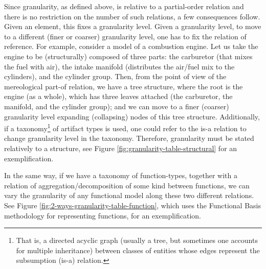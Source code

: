 \documentclass[
]{ceurart}
\begin{document}
\eflist
Since granularity, as defined above, is relative to a partial-order relation and there is no restriction on the number of such relations, a few consequences follow. Given an element, this fixes a granularity level. Given a granularity level, to move to a different (finer or coarser) granularity level, one has to fix the relation of reference. For example, consider a model of a combustion engine. Let us take the engine to be (structurally) composed of three parts: the carburetor (that mixes the fuel with air), the intake manifold (distributes the air/fuel mix to the cylinders), and the cylinder group. Then, from the point of view of the mereological part-of relation, we have a tree structure, where the root is the engine (as a whole), which has three leaves attached (the carburetor, the manifold, and the cylinder group); and we can move to a finer (coarser) granularity level expanding (collapsing) nodes of this tree structure. Additionally, if a taxonomy\footnote{That is, a directed acyclic graph (usually a tree, but sometimes one accounts for multiple inheritance) between classes of entities whose edges represent the subsumption (is-a) relation.} of artifact types is used, one could refer to the is-a relation to change granularity level in the taxonomy. Therefore, granularity must be stated relatively to a structure, see Figure \ref{fig:granularity-table-structural} for an exemplification. 

In the same way, if we have a taxonomy of function-types, together with a relation of aggregation/decomposition of some kind between functions, we can vary the granularity of any functional model along these two different relations. See Figure \ref{fig:2-ways-granularity-table-function}, which uses the Functional Basis methodology for representing functions, for an exemplification.
\end{document}
